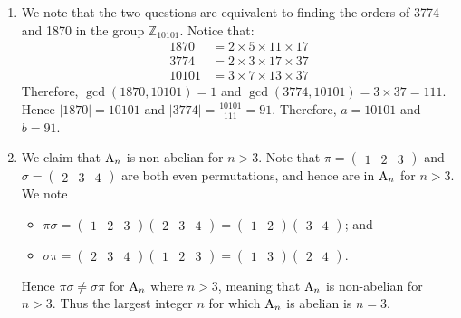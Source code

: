 \begin{enumerate}    
    \item We note that the two questions are equivalent to finding the orders of 3774 and 1870 in the group $\mathbb{Z}_{10101}$. Notice that:
    \begin{align*}
        1870 &= 2 \times 5 \times 11 \times 17\\
        3774 &= 2 \times 3 \times 17 \times 37\\
        10101 &= 3 \times 7 \times 13 \times 37
    \end{align*}
    Therefore, $\gcd(1870, 10101) = 1$ and $\gcd(3774, 10101) = 3 \times 37 = 111$. Hence $|1870| = 10101$ and $|3774| = \frac{10101}{111} = 91$. Therefore, $a = 10101$ and $b = 91$.

    \item We claim that $\mathrm{A}_{n}$ is non-abelian for $n > 3$. Note that $\pi = \begin{pmatrix}1 & 2 & 3\end{pmatrix}$ and $\sigma = \begin{pmatrix}2 & 3 & 4\end{pmatrix}$ are both even permutations, and hence are in $\mathrm{A}_{n}$ for $n > 3$. We note
    \begin{itemize}
        \item $\pi\sigma = \begin{pmatrix}1 & 2 & 3\end{pmatrix}\begin{pmatrix}2 & 3 & 4\end{pmatrix} = \begin{pmatrix}1 & 2\end{pmatrix}\begin{pmatrix}3 & 4\end{pmatrix}$; and
        \item $\sigma\pi = \begin{pmatrix}2 & 3 & 4\end{pmatrix}\begin{pmatrix}1 & 2 & 3\end{pmatrix} = \begin{pmatrix}1 & 3\end{pmatrix}\begin{pmatrix}2 & 4\end{pmatrix}$.
    \end{itemize}
    Hence $\pi\sigma \neq \sigma\pi$ for $\mathrm{A}_{n}$ where $n > 3$, meaning that $\mathrm{A}_{n}$ is non-abelian for $n > 3$. Thus the largest integer $n$ for which $\mathrm{A}_{n}$ is abelian is $n = 3$.
    

\end{enumerate}
